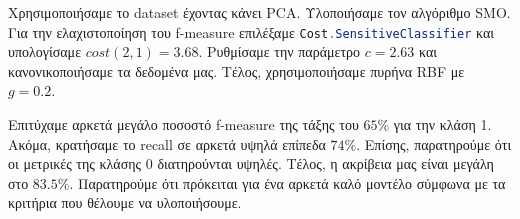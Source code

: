 \begin{sloppypar}
Χρησιμοποιήσαμε το dataset έχοντας κάνει PCA.
Υλοποιήσαμε τον αλγόριθμο SMO.
Για την ελαχιστοποίηση του f-measure επιλέξαμε
\lstinline[language=Java]!Cost.SensitiveClassifier!
και υπολογίσαμε $cost(2,1)=3.68$.
Ρυθμίσαμε την παράμετρο $c=2.63$ και κανονικοποιήσαμε τα δεδομένα μας.
Τέλος, χρησιμοποιήσαμε πυρήνα RBF με $g=0.2$.
\end{sloppypar}

Επιτύχαμε αρκετά μεγάλο ποσοστό f-measure της τάξης του $65\%$ για την κλάση 1.
Ακόμα, κρατήσαμε το recall σε αρκετά υψηλά επίπεδα $74\%$.
Επίσης, παρατηρούμε ότι οι μετρικές της κλάσης 0 διατηρούνται υψηλές.
Τέλος, η ακρίβεια μας είναι μεγάλη στο $83.5\%$.
Παρατηρούμε ότι πρόκειται για ένα αρκετά καλό μοντέλο σύμφωνα με τα κριτήρια που θέλουμε να υλοποιήσουμε.